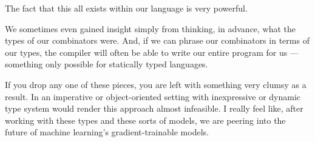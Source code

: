 \documentclass[]{article}
\begin{document}
\begin{enumerate}
  The fact that this all exists within our language is very powerful.

  We sometimes even gained insight simply from thinking, in advance, what the
  types of our combinators were. And, if we can phrase our combinators in terms
  of our types, the compiler will often be able to write our entire program for
  us --- something only possible for statically typed languages.
\end{enumerate}

If you drop any one of these pieces, you are left with something very clumsy as
a result. In an imperative or object-oriented setting with inexpressive or
dynamic type system would render this approach almost infeasible. I really feel
like, after working with these types and these sorts of models, we are peering
into the future of machine learning's gradient-trainable models.
\end{document}
